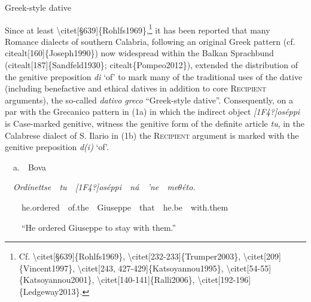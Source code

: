 \documentclass[output=paper,modfonts,nonflat]{langsci/langscibook}
\begin{document}
\begin{listWWNumxileveli}
\item 
\begin{stylelsSectioni}
Greek-style dative
\end{stylelsSectioni}
\end{listWWNumxileveli}
\begin{styleStandard}
Since at least {\textbackslash}citet[§639]\{Rohlfs1969\},\footnote{ Cf. {\textbackslash}citet[§639]\{Rohlfs1969\}, {\textbackslash}citet[232-233]\{Trumper2003\}, {\textbackslash}citet[209]\{Vincent1997\}, {\textbackslash}citet[243, 427-429]\{Katsoyannou1995\}, {\textbackslash}citet[54-55]\{Katsoyannou2001\}, {\textbackslash}citet[140-141]\{Ralli2006\}, {\textbackslash}citet[192-196]\{Ledgeway2013\}.} it has been reported that many Romance dialects of southern Calabria, following an original Greek pattern (cf. citealt[160]\{Joseph1990\}) now widespread within the Balkan Sprachbund (citealt[187]\{Sandfeld1930\}; citealt\{Pompeo2012\}), extended the distribution of the genitive preposition \textit{di }‘of’ to mark many of the traditional uses of the dative (including benefactive and ethical datives in addition to core \textsc{Recipient} arguments), the so-called \textit{dativo greco }“Greek-style dative”. Consequently, on a par with the Grecanico pattern in (1a) in which the indirect object \textit{[1F4?]oséppi} is Case-marked genitive, witness the genitive form of the definite article \textit{tu}, in the Calabrese dialect of S. Ilario in (1b) the \textsc{Recipient} argument is marked with the genitive preposition \textit{d(i) }‘of’. 
\end{styleStandard}


\setcounter{listWWNumviiileveli}{0}
\begin{listWWNumviiileveli}
\item 
\begin{styleListParagraph}
\ \ a.\ \ Bova\ \ 
\end{styleListParagraph}
\end{listWWNumviiileveli}
\begin{styleStandard}
\ \ \textit{Ordínettse\ \ tu\ \ [1F4?]oséppi\ \ ná\ \ ’ne\ \ me${\theta}$éto.\ \ }
\end{styleStandard}

\begin{styleStandard}
\ \ \ \ he.ordered\ \ of.the\ \ Giuseppe\ \ that\ \ he.be\ \ with.them
\end{styleStandard}

\begin{styleStandard}
\ \ \ \ “He ordered Giuseppe to stay with them.”
\end{styleStandard}
\end{document}
